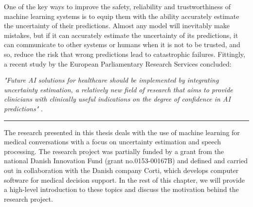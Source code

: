 One of the key ways to improve the safety, reliability and trustworthiness of machine learning systems is to equip them with the ability accurately estimate the uncertainty of their predictions. 
Almost any model will inevitably make mistakes, but if it can accurately estimate the uncertainty of its predictions, it can communicate to other systems or humans when it is not to be trusted, and so, reduce the risk that wrong predictions lead to catastrophic failures.
Fittingly, a recent study by the European Parliamentary Research Services concluded: 

\begin{center}

\textit{"Future AI solutions for healthcare should be implemented by integrating uncertainty estimation, a relatively new field of research that aims to provide clinicians with clinically useful indications on the degree of confidence in AI predictions"} \cite{europeanparliament_artificial_2022}. 

\end{center}


\vspace{0.5em}
\begin{center}
\noindent\rule{0.2\textwidth}{0.5pt}
\end{center}
\vspace{1em}

\noindent The research presented in this thesis deals with the use of machine learning for medical conversations with a focus on uncertainty estimation and speech processing. 
The research project was partially funded by a grant from the national Danish Innovation Fund (grant no.\@ 0153-00167B) and defined and carried out in collaboration with the Danish company Corti, which develops computer software for medical decision support. 
In the rest of this chapter, we will provide a high-level introduction to these topics and discuss the motivation behind the research project.



